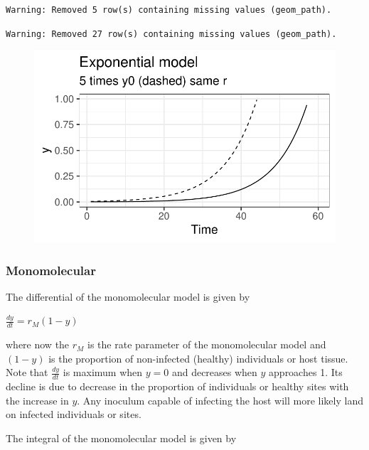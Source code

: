 \documentclass[
  letterpaper,
  DIV=11,
  numbers=noendperiod]{scrreprt}
\begin{document}
\begin{verbatim}
Warning: Removed 5 row(s) containing missing values (geom_path).
\end{verbatim}

\begin{verbatim}
Warning: Removed 27 row(s) containing missing values (geom_path).
\end{verbatim}

\begin{figure}[H]

{\centering \includegraphics{./temporal-models_files/figure-pdf/unnamed-chunk-8-1.pdf}

}

\end{figure}

\hypertarget{monomolecular}{%
\subsubsection{Monomolecular}\label{monomolecular}}

The differential of the monomolecular model is given by

\(\frac{dy}{dt} = r_M (1-y)\)

where now the \(r_M\) is the rate parameter of the monomolecular model
and \((1-y)\) is the proportion of non-infected (healthy) individuals or
host tissue. Note that \(\frac{dy}{dt}\) is maximum when \(y = 0\) and
decreases when \(y\) approaches 1. Its decline is due to decrease in the
proportion of individuals or healthy sites with the increase in \(y\).
Any inoculum capable of infecting the host will more likely land on
infected individuals or sites.

The integral of the monomolecular model is given by
\end{document}
